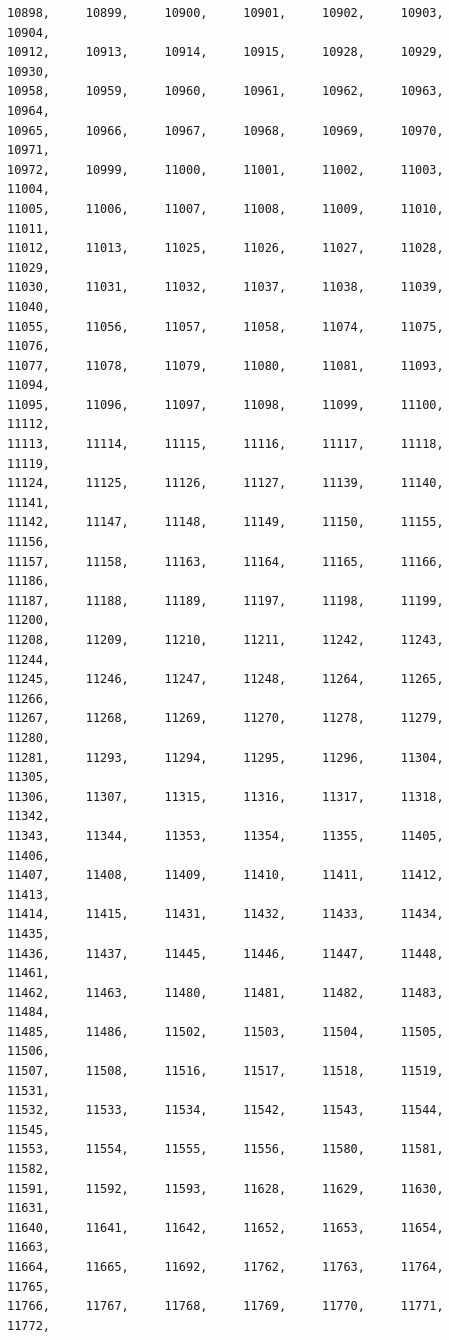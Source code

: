 \documentclass[a4paper,11pt]{report}
\begin{document}
\begin{verbatim}
10898,     10899,     10900,     10901,     10902,     10903,     10904,     
10912,     10913,     10914,     10915,     10928,     10929,     10930,     
10958,     10959,     10960,     10961,     10962,     10963,     10964,     
10965,     10966,     10967,     10968,     10969,     10970,     10971,     
10972,     10999,     11000,     11001,     11002,     11003,     11004,     
11005,     11006,     11007,     11008,     11009,     11010,     11011,     
11012,     11013,     11025,     11026,     11027,     11028,     11029,     
11030,     11031,     11032,     11037,     11038,     11039,     11040,     
11055,     11056,     11057,     11058,     11074,     11075,     11076,     
11077,     11078,     11079,     11080,     11081,     11093,     11094,     
11095,     11096,     11097,     11098,     11099,     11100,     11112,     
11113,     11114,     11115,     11116,     11117,     11118,     11119,     
11124,     11125,     11126,     11127,     11139,     11140,     11141,     
11142,     11147,     11148,     11149,     11150,     11155,     11156,     
11157,     11158,     11163,     11164,     11165,     11166,     11186,     
11187,     11188,     11189,     11197,     11198,     11199,     11200,     
11208,     11209,     11210,     11211,     11242,     11243,     11244,     
11245,     11246,     11247,     11248,     11264,     11265,     11266,     
11267,     11268,     11269,     11270,     11278,     11279,     11280,     
11281,     11293,     11294,     11295,     11296,     11304,     11305,     
11306,     11307,     11315,     11316,     11317,     11318,     11342,     
11343,     11344,     11353,     11354,     11355,     11405,     11406,     
11407,     11408,     11409,     11410,     11411,     11412,     11413,     
11414,     11415,     11431,     11432,     11433,     11434,     11435,     
11436,     11437,     11445,     11446,     11447,     11448,     11461,     
11462,     11463,     11480,     11481,     11482,     11483,     11484,     
11485,     11486,     11502,     11503,     11504,     11505,     11506,     
11507,     11508,     11516,     11517,     11518,     11519,     11531,     
11532,     11533,     11534,     11542,     11543,     11544,     11545,     
11553,     11554,     11555,     11556,     11580,     11581,     11582,     
11591,     11592,     11593,     11628,     11629,     11630,     11631,     
11640,     11641,     11642,     11652,     11653,     11654,     11663,     
11664,     11665,     11692,     11762,     11763,     11764,     11765,     
11766,     11767,     11768,     11769,     11770,     11771,     11772,     

\end{verbatim}
\end{document}

